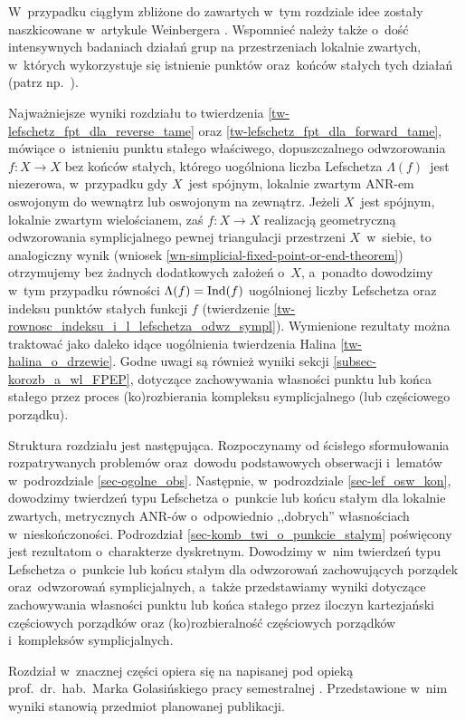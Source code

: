 W~przypadku ciągłym zbliżone do zawartych w~tym rozdziale idee zostały naszkicowane w~artykule Weinbergera \cite{Weinberger09}. Wspomnieć należy także o~dość intensywnych badaniach działań grup na przestrzeniach lokalnie zwartych, w~których wykorzystuje się istnienie punktów oraz~końców stałych tych działań (patrz np.~\cite{Hamann11,Moller95}). 

Najważniejsze wyniki rozdziału to twierdzenia \ref{tw-lefschetz_fpt_dla_reverse_tame} oraz \ref{tw-lefschetz_fpt_dla_forward_tame}, mówiące o~istnieniu punktu stałego właściwego, dopuszczalnego odwzorowania \mbox{$f\colon X\to X$} bez końców stałych, którego uogólniona liczba Lefschetza $\Lambda(f)$~jest niezerowa, w~przypadku gdy $X$~jest spójnym, lokalnie zwartym ANR-em oswojonym do wewnątrz lub oswojonym na zewnątrz. Jeżeli $X$~jest spójnym, lokalnie zwartym wielościanem, zaś $f\colon X\to X$ realizacją geometryczną odwzorowania symplicjalnego pewnej triangulacji przestrzeni $X$~w~siebie, to analogiczny wynik (wniosek \ref{wn-simplicial-fixed-point-or-end-theorem}) otrzymujemy bez żadnych dodatkowych założeń o~$X$, a~ponadto dowodzimy w~tym przypadku równości $\Lambda(f)=\operatorname{Ind}(f)$ uogólnionej liczby Lefschetza oraz indeksu punktów stałych funkcji $f$ (twierdzenie \ref{tw-rownosc_indeksu_i_l_lefschetza_odwz_sympl}). Wymienione rezultaty można traktować jako daleko idące uogólnienia twierdzenia Halina \ref{tw-halina_o_drzewie}. Godne uwagi są również wyniki sekcji \ref{subsec-korozb_a_wl_FPEP}, dotyczące zachowywania własności punktu lub końca stałego przez proces (ko)rozbierania kompleksu symplicjalnego (lub częściowego porządku).

Struktura rozdziału jest następująca. Rozpoczynamy od ścisłego sformułowania rozpatrywanych problemów oraz~dowodu podstawowych obserwacji i~lematów w~podrozdziale \ref{sec-ogolne_obs}. Następnie, w~podrozdziale \ref{sec-lef_osw_kon}, dowodzimy twierdzeń typu Lefschetza o~punkcie lub końcu stałym dla lokalnie zwartych, metrycznych ANR-ów o~odpowiednio ,,dobrych'' własnościach w~nieskończoności. Podrozdział \ref{sec-komb_twi_o_punkcie_stalym} poświęcony jest rezultatom o~charakterze dyskretnym. Dowodzimy w~nim twierdzeń typu Lefschetza o~punkcie lub końcu stałym dla odwzorowań zachowujących porządek oraz~odwzorowań symplicjalnych, a~także przedstawiamy wyniki dotyczące zachowywania własności punktu lub końca stałego przez iloczyn kartezjański częściowych porządków oraz (ko)rozbieralność częściowych porządków i~kompleksów symplicjalnych.

Rozdział w~znacznej części opiera się na napisanej pod opieką prof.~dr.~hab.~Marka Golasińskiego pracy semestralnej \cite{Kukiela12}. Przedstawione w~nim wyniki stanowią przedmiot planowanej publikacji.\\

